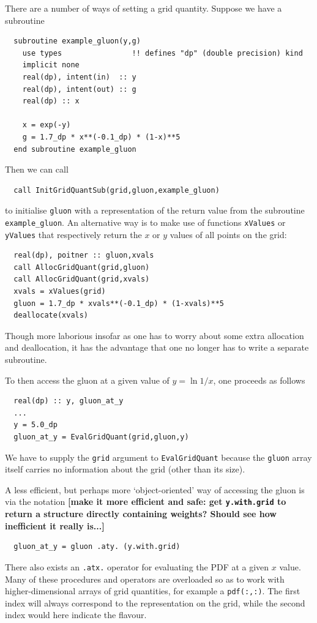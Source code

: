 \documentclass[12pt]{article}
\newcommand{\comment}[1]{\textbf{[#1]}}
\newcommand{\ttt}[1]{\texttt{#1}}
\begin{document}
There are a number of ways of setting a grid quantity. Suppose we have
a subroutine
\begin{verbatim}
  subroutine example_gluon(y,g)
    use types                !! defines "dp" (double precision) kind
    implicit none
    real(dp), intent(in)  :: y
    real(dp), intent(out) :: g
    real(dp) :: x
    
    x = exp(-y)
    g = 1.7_dp * x**(-0.1_dp) * (1-x)**5 
  end subroutine example_gluon
\end{verbatim}
Then we can call
\begin{verbatim}
  call InitGridQuantSub(grid,gluon,example_gluon)
\end{verbatim}
to initialise \texttt{gluon} with a representation of the return value
from the subroutine \texttt{example\_gluon}. An alternative way is to
make use of functions \texttt{xValues} or \texttt{yValues} that
respectively return the $x$ or $y$ values of all points on the grid:
\begin{verbatim}
  real(dp), poitner :: gluon,xvals
  call AllocGridQuant(grid,gluon)
  call AllocGridQuant(grid,xvals)
  xvals = xValues(grid)
  gluon = 1.7_dp * xvals**(-0.1_dp) * (1-xvals)**5 
  deallocate(xvals)
\end{verbatim}
Though more laborious insofar as one has to worry about some extra
allocation and deallocation, it has the advantage that one no longer
has to write a separate subroutine.
 

To then access the gluon at a given value of $y = \ln 1/x$, one
proceeds as follows
\begin{verbatim}
  real(dp) :: y, gluon_at_y
  ...
  y = 5.0_dp
  gluon_at_y = EvalGridQuant(grid,gluon,y)
\end{verbatim}
We have to supply the \texttt{grid} argument to \ttt{EvalGridQuant}
because the \ttt{gluon} array itself carries no information about the
grid (other than its size).

A less efficient, but perhaps more `object-oriented' way of accessing
the gluon is via the notation \comment{make it more efficient and
  safe: get \texttt{y.with.grid} to return a structure directly
  containing weights? Should see how inefficient it really is...}
\begin{verbatim}
  gluon_at_y = gluon .aty. (y.with.grid)
\end{verbatim}
There also exists an \ttt{.atx.} operator for evaluating the PDF at a
given $x$ value.  Many of these procedures and operators are
overloaded so as to work with higher-dimensional arrays of grid
quantities, for example a \texttt{pdf(:,:)}. The first index will
always correspond to the representation on the grid, while the second
index would here indicate the flavour.
\end{document}
